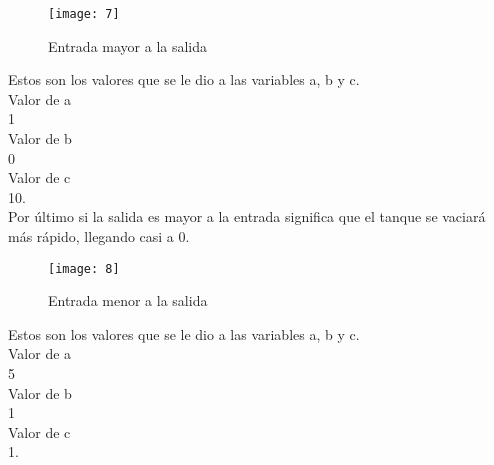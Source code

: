 \documentclass[12pt]{article}
\begin{document}
\begin{figure}[h]
	\centering
	\texttt{[image: 7]}
	\caption{Entrada mayor a la salida}\label{figura 6}
\end{figure}

Estos son los valores que se le dio a las variables a, b y c.\\
Valor de a \\
1\\
Valor de b\\ 
0\\
Valor de c\\ 
10.\\

Por último si la salida es mayor a la entrada significa que el tanque se vaciará más rápido, llegando casi a 0.

\begin{figure}[h]
	\centering
	\texttt{[image: 8]}
	\caption{Entrada menor a la salida}\label{figura 7}
\end{figure}

Estos son los valores que se le dio a las variables a, b y c.\\
Valor de a \\
5\\
Valor de b\\ 
1\\
Valor de c\\ 
1.\\
\end{document}
